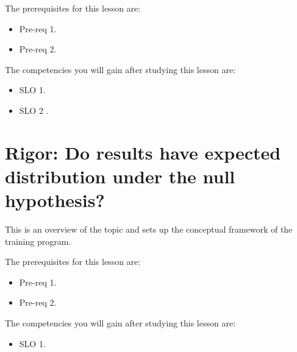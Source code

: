 The prerequisites for this lesson are: 




\begin{itemize}
    \item Pre-req 1.
\end{itemize}

\begin{itemize}
    \item Pre-req 2.
\end{itemize}




The competencies you will gain after studying this lesson are: 




\begin{itemize}
    \item SLO 1.
\end{itemize}

\begin{itemize}
    \item SLO 2 .
\end{itemize}

\section{Rigor: Do results have expected distribution under the null hypothesis?}
\label{sec:rigor-do-results-have-expected-distribution-under-the-null-hypothesis}

This is an overview of the topic and sets up the conceptual framework of the training program.




The prerequisites for this lesson are: 




\begin{itemize}
    \item Pre-req 1.
\end{itemize}

\begin{itemize}
    \item Pre-req 2.
\end{itemize}




The competencies you will gain after studying this lesson are: 




\begin{itemize}
    \item SLO 1.
\end{itemize}

